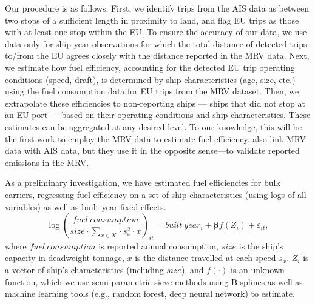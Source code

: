 \documentclass[hidelinks, 12pt,letterpaper]{article}
\begin{document}
Our procedure is as follows. First, we identify trips from the AIS data as between two stops of a sufficient length in proximity to land, and flag EU trips as those with at least one stop within the EU. To ensure the accuracy of our data, we use data only for ship-year observations for which the total distance of detected trips to/from the EU agrees closely with the distance reported in the MRV data. %
Next, we estimate how fuel efficiency, accounting for the detected EU trip operating conditions (speed, draft), is determined by ship characteristics (age, size, etc.) using the fuel consumption data for EU trips from the MRV dataset. 
Then, we extrapolate these efficiencies to non-reporting ships --- ships that did not stop at an EU port --- based on their operating conditions and ship characteristics. 
These estimates can be aggregated at any desired level. To our knowledge, this will be the first work to employ the MRV data to estimate fuel efficiency. \citet{uge2020estimation} also link MRV data with AIS data, but they use it in the opposite sense---to validate reported emissions in the MRV.

As a preliminary investigation, we have estimated fuel efficiencies for bulk carriers, regressing fuel efficiency on a set of ship characteristics (using logs of all variables) as well as built-year fixed effects.
 \begin{equation}\label{eq1}
 \log\left(
     \frac{fuel~consumption}{size \cdot \sum_{x \in X}  \cdot s_x^2 \cdot x}
 \right)_{it}
         = built~year_{i} + \boldsymbol{\beta} f(Z_i) + \varepsilon_{it},
 \end{equation}
 where $fuel~consumption$ is reported annual consumption, $size$ is the ship's capacity in deadweight tonnage, $x$ is the distance travelled at each speed $s_x$, $Z_i$ is a vector of ship's characteristics (including $size$), and $f(\cdot)$ is an unknown function, which we use semi-parametric sieve methods using B-splines as well as machine learning tools (e.g., random forest, deep neural network) to estimate.
 
\end{document}
